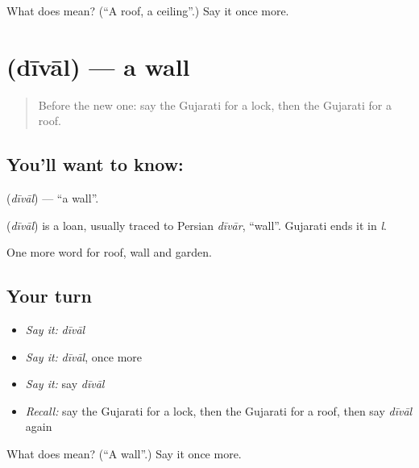 \begin{tcolorbox}[breakable,colback=teal!4,colframe=teal!35!black,title={Before you move on}]
What does  mean? (\textquotedblleft{}A roof, a ceiling\textquotedblright{}.) Say it once more.
\end{tcolorbox}
\section[\texorpdfstring{\gu{દીવાલ} (dīvāl)}{દીવાલ (dīvāl)}]{ (dīvāl) — a wall}

\label{lesson:GU-C63-wall}



\begin{quote}
Before the new one: say the Gujarati for a lock, then the Gujarati for a roof.
\end{quote}

\subsection*{You'll want to know: }
\textbf{} (\emph{dīvāl}) — \textquotedblleft{}a wall\textquotedblright{}.

\begin{cousinweb}
\textbf{} (\emph{dīvāl}) is a loan, usually traced to Persian \emph{dīvār}, \textquotedblleft{}wall\textquotedblright{}. Gujarati ends it in \emph{l}.
\end{cousinweb}

\begin{grammarlens}[title={What you've built}]
One more word for roof, wall and garden.
\end{grammarlens}

\subsection*{Your turn}
\begin{itemize}
\raggedright
  \item \emph{Say it:} \emph{dīvāl}
  \item \emph{Say it:} \emph{dīvāl}, once more
  \item \emph{Say it:} say \emph{dīvāl}
  \item \emph{Recall:} say the Gujarati for a lock, then the Gujarati for a roof, then say \emph{dīvāl} again
\end{itemize}

\begin{tcolorbox}[breakable,colback=teal!4,colframe=teal!35!black,title={Before you move on}]
What does  mean? (\textquotedblleft{}A wall\textquotedblright{}.) Say it once more.
\end{tcolorbox}
